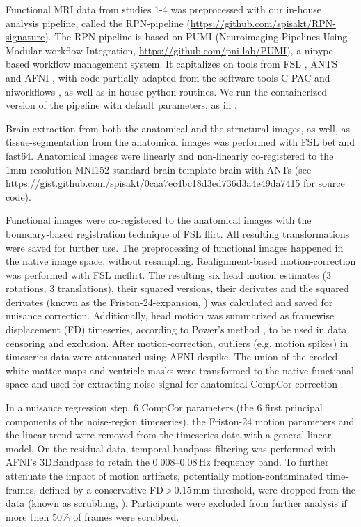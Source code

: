 \documentclass{article}
\begin{document}
Functional MRI data from studies 1-4 was preprocessed with our in-house analysis pipeline, called the RPN-pipeline (\href{https://github.com/spisakt/RPN-signature}{https://github.com/spisakt/RPN-signature}). The RPN-pipeline is based on PUMI (Neuroimaging Pipelines Using Modular workflow Integration, \href{https://github.com/pni-lab/PUMI}{https://github.com/pni-lab/PUMI}), a nipype-based \citep{gorgolewski2011nipype} workflow management system. It capitalizes on tools from FSL \citep{jenkinson2012fsl}, ANTS \citep{avants2011reproducible} and AFNI \citep{cox1996afni}, with code partially adapted from the software tools C-PAC \citep{craddock2013towards} and niworkflows \citep{esteban2019fmriprep}, as well as in-house python routines. We run the containerized version of the pipeline with default parameters, as in \cite{Spisak_2020}.

Brain extraction from both the anatomical and the structural images, as well, as tissue-segmentation from the anatomical images was performed with FSL bet and fast64. Anatomical images were linearly and non-linearly co-registered to the 1mm-resolution MNI152 standard brain template brain with ANTs (see \href{https://gist.github.com/spisakt/0caa7ec4bc18d3ed736d3a4e49da7415}{https://gist.github.com/spisakt/0caa7ec4bc18d3ed736d3a4e49da7415} for source code).

Functional images were co-registered to the anatomical images with the boundary-based registration technique of FSL flirt. All resulting transformations were saved for further use. The preprocessing of functional images happened in the native image space, without resampling. Realignment-based motion-correction was performed with FSL mcflirt. The resulting six head motion estimates (3 rotations, 3 translations), their squared versions, their derivates and the squared derivates (known as the Friston-24-expansion, \cite{friston1996movement}) was calculated and saved for nuisance correction. Additionally, head motion was summarized as framewise displacement (FD) timeseries, according to Power's method \citep{power2012spurious}, to be used in data censoring and exclusion. After motion-correction, outliers (e.g. motion spikes) in timeseries data were attenuated using AFNI despike. The union of the eroded white-matter maps and ventricle masks were transformed to the native functional space and used for extracting noise-signal for anatomical CompCor correction \citep{behzadi2007component}.

In a nuisance regression step, 6 CompCor parameters (the 6 first principal components of the noise-region timeseries), the Friston-24 motion parameters and the linear trend were removed from the timeseries data with a general linear model. On the residual data, temporal bandpass filtering was performed with AFNI's 3DBandpass to retain the 0.008--0.08\,Hz frequency band. To further attenuate the impact of motion artifacts, potentially motion-contaminated time-frames, defined by a conservative FD\,\textgreater \,0.15\,mm threshold, were dropped from the data (known as scrubbing, \cite{satterthwaite2013improved}). Participants were excluded from further analysis if more then 50\% of frames were scrubbed.
\end{document}
